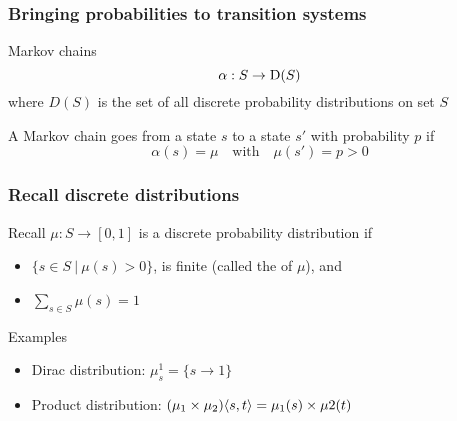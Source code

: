 \documentclass[aspectratio=169]{beamer}
\begin{document}
\begin{frame}[t]\frametitle{Bringing probabilities to transition systems}
  
  \begin{alertblock}{Markov chains}
    $$\alpha : S \to \mathrm{D}(S)$$
    where $D(S)$ is the set of all \alert{discrete probability distributions} on set $S$

    A Markov chain goes from a state $s$ to a state $s'$ with probability $p$ if
    $$\alpha(s) = \mu\text{~~~with~~~} \mu(s') = p > 0$$
  \end{alertblock}


\end{frame}


\begin{frame}[t]\frametitle{Recall discrete distributions}

  \begin{block}{Recall}
  $\mu: S\to [0,1]$ is a \alert{discrete probability distribution} if
  \begin{itemize}
  \item $\{s \in S ~|~ \mu(s) >0\}$, is finite (called the  of $\mu$), and
  \item $\sum_{s\in S} \mu(s) = 1$
  \end{itemize}
  \end{block}

  \begin{exampleblock}{Examples}
  \begin{itemize}
        \item \alert{Dirac distribution}: $\mu^1_s = \{s \to 1\}$
        \item \alert{Product distribution}: $(\mu_1 \times\mu_2)\langle s,t \rangle = \mu_1(s) \times \mu 2(t)$
  \end{itemize}    
  \end{exampleblock}
\end{frame}
\end{document}
